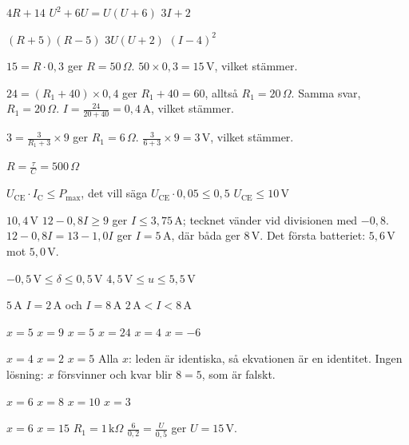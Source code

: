 
\begin{facit}

  $4R + 14$  $U^2 + 6U = U(U + 6)$  $3I + 2$

  $(R + 5)(R - 5)$  $3U(U + 2)$  $(I - 4)^2$

  $15 = R \cdot 0{,}3$ ger $R = 50\,\Omega$.
 $50 \times 0{,}3 = 15\,\text{V}$, vilket stämmer.

  $24 = (R_1 + 40) \times 0{,}4$ ger $R_1 + 40 = 60$, alltså $R_1 = 20\,\Omega$.
 Samma svar, $R_1 = 20\,\Omega$.
 $I = \frac{24}{20 + 40} = 0{,}4\,\text{A}$, vilket stämmer.

  $3 = \frac{3}{R_1 + 3} \times 9$ ger $R_1 = 6\,\Omega$.
 $\frac{3}{6 + 3} \times 9 = 3\,\text{V}$, vilket stämmer.

 $R = \frac{\tau}{C} = 500\,\Omega$

  $U_{\text{CE}} \cdot I_{\text{C}} \leq P_{\max}$, det vill säga
$U_{\text{CE}} \cdot 0{,}05 \leq 0{,}5$  $U_{\text{CE}} \leq 10\,\text{V}$

  $10{,}4\,\text{V}$
 $12 - 0{,}8I \geq 9$ ger $I \leq 3{,}75\,\text{A}$; tecknet vänder vid divisionen med
$-0{,}8$.
 $12 - 0{,}8I = 13 - 1{,}0I$ ger $I = 5\,\text{A}$, där båda ger $8\,\text{V}$.
 Det första batteriet: $5{,}6\,\text{V}$ mot $5{,}0\,\text{V}$.

  $-0{,}5\,\text{V} \leq \delta \leq 0{,}5\,\text{V}$
 $4{,}5\,\text{V} \leq u \leq 5{,}5\,\text{V}$

  $5\,\text{A}$  $I = 2\,\text{A}$ och $I = 8\,\text{A}$
 $2\,\text{A} < I < 8\,\text{A}$

  $x = 5$  $x = 9$  $x = 5$  $x = 24$  $x = 4$
 $x = -6$

  $x = 4$  $x = 2$  $x = 5$
 Alla $x$: leden är identiska, så ekvationen är en identitet.
 Ingen lösning: $x$ försvinner och kvar blir $8 = 5$, som är falskt.

  $x = 6$  $x = 8$  $x = 10$  $x = 3$

  $x = 6$  $x = 15$  $R_1 = 1\,\text{k}\Omega$
 $\frac{6}{0{,}2} = \frac{U}{0{,}5}$ ger $U = 15\,\text{V}$.


\end{facit}
